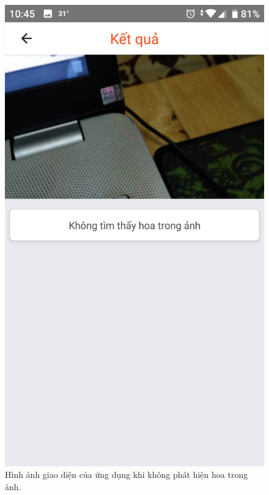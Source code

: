 \documentclass[12pt]{report}
\begin{document}
\begin{figure}[h]
			\includegraphics[scale=0.2]{app_no_flower2}
			\caption{Hình ảnh giao diện của ứng dụng khi không phát hiện hoa trong ảnh.}
			\label{fig:app_no_flower}
		\end{figure}
				
\end{document}
